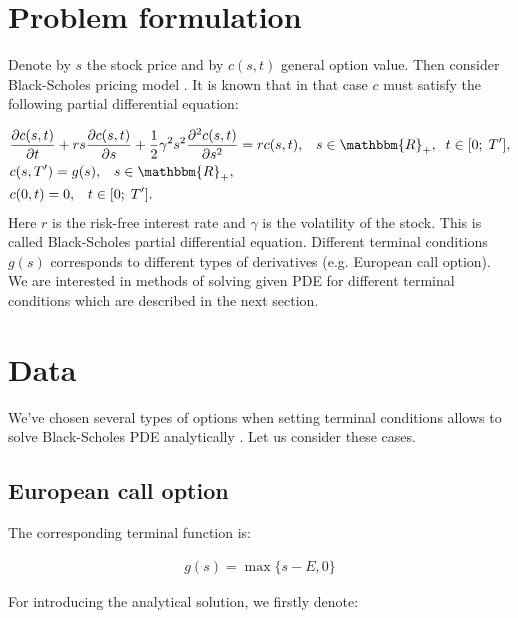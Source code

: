 \documentclass[11pt,a4paper]{extarticle}
\begin{document}
\section{Problem formulation}

Denote by $s$ the stock price and by $c(s,t)$ general option value. Then consider Black-Scholes pricing model \cite{bs}. It is known that in that case $c$ must satisfy the following partial differential equation:

\begin{equation}
	\begin{aligned}
		&\frac{\partial c(s,t)}{\partial t} + rs \frac{\partial c(s,t)}{\partial s} + \frac12 \gamma^2 s^2 \frac{\partial^2 c(s,t)}{\partial s^2} = rc(s,t),
		\;\;\;s \in \mathbbm{R}_{+},\;\; t \in [0;\;T^{\prime}],\\
		&c(s,T^{\prime}) = g(s), \;\;\; s \in \mathbbm{R}_{+},\\
		&c(0,t) = 0, \;\;\; t \in [0;\;T^{\prime}].
	\end{aligned}
\end{equation}
Here  $r$ is the risk-free interest rate and $\gamma$ is the volatility of the stock.
This is called Black-Scholes partial differential equation. Different terminal conditions $g(s)$ corresponds to different types of derivatives (e.g. European call option). We are interested in methods of solving given PDE for different terminal conditions which are described in the next section.

\section{Data}

We've chosen several types of options when setting terminal conditions allows to solve Black-Scholes PDE analytically \cite{options}. Let us consider these cases.

\subsection{European call option}

The corresponding terminal function is:

\begin{equation}
    \begin{aligned}
    g(s)=\max\{s-E, 0\}
    \end{aligned}
    \end{equation}

For introducing the analytical solution, we firstly denote:
\end{document}
